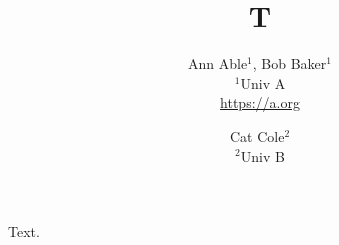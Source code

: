 \documentclass{article}
\title{T}
\author{Ann Able$^1$, Bob Baker$^1$ \\ $^1$Univ A \\ \url{https://a.org} \and Cat Cole$^2$ \\ $^2$Univ B}
\begin{document}
\maketitle
Text.
\end{document}
